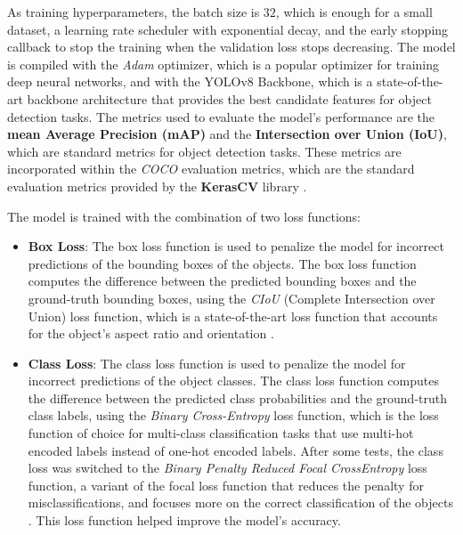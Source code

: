 As training hyperparameters, the batch size is $32$, which is enough for a small dataset,
a learning rate scheduler with exponential decay, and the early stopping callback to stop the training
when the validation loss stops decreasing. The model is compiled with the \textit{Adam} optimizer, which is a popular optimizer
for training deep neural networks, and with the YOLOv8 Backbone, which is a state-of-the-art backbone architecture
that provides the best candidate features for object detection tasks. The metrics used to evaluate the model's performance
are the \textbf{mean Average Precision (mAP)} and the \textbf{Intersection over Union (IoU)},
which are standard metrics for object detection tasks. These metrics are incorporated within the \textit{COCO} evaluation metrics,
which are the standard evaluation metrics provided by the \textbf{KerasCV} library \cite{wood2022kerascv}.

The model is trained with the combination of two loss functions:

\begin{itemize}
    \item \textbf{Box Loss}: The box loss function is used to penalize the model for incorrect predictions of the bounding
    boxes of the objects. The box loss function computes the difference between the predicted bounding boxes and the
    ground-truth bounding boxes, using the \textit{CIoU} (Complete Intersection over Union) loss function, which is a
    state-of-the-art loss function that accounts for the object's aspect ratio and orientation \cite{zheng2021ciou}.
    \item \textbf{Class Loss}: The class loss function is used to penalize the model for incorrect predictions of the
    object classes. The class loss function computes the difference between the predicted class probabilities and the
    ground-truth class labels, using the \textit{Binary Cross-Entropy} loss function, which is the loss function of
    choice for multi-class classification tasks that use multi-hot encoded labels instead of one-hot encoded labels.
    After some tests, the class loss was switched to the \textit{Binary Penalty Reduced Focal CrossEntropy} 
    loss function, a variant of the focal loss function that reduces the penalty for misclassifications, 
    and focuses more on the correct classification of the objects \cite{law2019cornernet}. 
    This loss function helped improve the model's accuracy.
\end{itemize}


